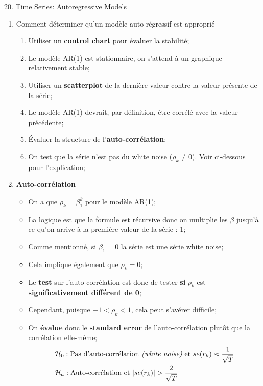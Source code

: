 \documentclass[12pt, titlepage, french]{report}
\begin{document}
\begin{CHPT_SUMM}[label = {timeseries20}]{20. Time Series: Autoregressive Models}
\begin{enumerate}
\begin{itemize}
		\item[]	Ce faisant, le domaine de $\beta_{1}$ implique que le modèle auto-régressif sera stationnaire sans être une série white noise;
		\end{itemize}
	\item[]	Comment déterminer qu'un modèle auto-régressif est approprié
		\begin{enumerate}[label = \roman*.]
		\item	Utiliser un \textbf{control chart} pour évaluer la stabilité;
		\item[]	Le modèle AR(1) est stationnaire, on s'attend à un graphique relativement stable;
		\item	Utiliser un \textbf{scatterplot} de la dernière valeur contre la valeur présente de la série;
		\item[]	Le modèle AR(1) devrait, par définition, être corrélé avec la valeur précédente;
		\item	Évaluer la structure de l'\textbf{auto-corrélation};
		\item[]	On test que la série n'est pas du white noise ($\rho_{k} \neq 0$). Voir ci-dessous pour l'explication;
		\end{enumerate}
	\item[]	\textbf{Auto-corrélation}
		\begin{itemize}
		\item	On a que $\rho_{k} = \beta^{k}_{1}$ pour le modèle AR(1);
		\item[]	La logique est que la formule est récursive donc on multiplie les $\beta$ jusqu'à ce qu'on arrive à la première valeur de la série : 1;
		\item	Comme mentionné, si $\beta_{1} = 0$ la série est une série white noise;
		\item[]	Cela implique également que $\rho_{k} = 0$;
		\item	Le \textbf{test} sur l'auto-corrélation est donc de tester \textbf{si} $\rho_{k}$ est \textbf{significativement différent de 0};
		\item[]	Cependant, puisque $-1 < \rho_{k} < 1$, cela peut s'avérer difficile;
		\item[] On \textbf{évalue} donc le \textbf{standard error} de l'auto-corrélation plutôt que la corrélation elle-même;
		\setlength{\mathindent}{-1cm}
		\begin{align*}
			&\mathcal{H}_{0}: \text{Pas d'auto-corrélation \textit{(white noise)} et } se(r_{k}) \approx \frac{1}{\sqrt{T}}	\\
			&\mathcal{H}_{a}: \text{Auto-corrélation et } | se(r_{k}) | > \frac{2}{\sqrt{T}}	

\end{align*}
\end{itemize}
\end{enumerate}
\end{CHPT_SUMM}
\end{document}
